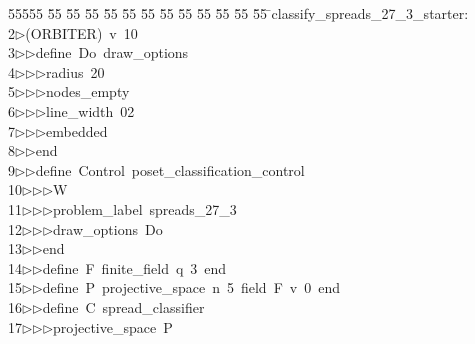 %
%
\begin{tabbing}
55555 \= 55 \= 55 \= 55 \= 55 \= 55 \= 55 \= 55 \= 55 \= 55 \= 55 \= 55 \= 55 \= \>classify\_spreads\_27\_3\_starter:\\[0pt]
2\>$\triangleright$\>(ORBITER)\ v\ 10\ \\[0pt]
3\>$\triangleright$\>$\triangleright$\>define\ Do\ draw\_options\ \\[0pt]
4\>$\triangleright$\>$\triangleright$\>$\triangleright$\>radius\ 20\ \\[0pt]
5\>$\triangleright$\>$\triangleright$\>$\triangleright$\>nodes\_empty\ \\[0pt]
6\>$\triangleright$\>$\triangleright$\>$\triangleright$\>line\_width\ 02\ \\[0pt]
7\>$\triangleright$\>$\triangleright$\>$\triangleright$\>embedded\ \\[0pt]
8\>$\triangleright$\>$\triangleright$\>end\ \\[0pt]
9\>$\triangleright$\>$\triangleright$\>define\ Control\ poset\_classification\_control\ \\[0pt]
10\>$\triangleright$\>$\triangleright$\>$\triangleright$\>W\ \\[0pt]
11\>$\triangleright$\>$\triangleright$\>$\triangleright$\>problem\_label\ spreads\_27\_3\ \\[0pt]
12\>$\triangleright$\>$\triangleright$\>$\triangleright$\>draw\_options\ Do\ \\[0pt]
13\>$\triangleright$\>$\triangleright$\>end\ \\[0pt]
14\>$\triangleright$\>$\triangleright$\>define\ F\ finite\_field\ q\ 3\ end\ \\[0pt]
15\>$\triangleright$\>$\triangleright$\>define\ P\ projective\_space\ n\ 5\ field\ F\ v\ 0\ end\ \\[0pt]
16\>$\triangleright$\>$\triangleright$\>define\ C\ spread\_classifier\ \\[0pt]
17\>$\triangleright$\>$\triangleright$\>$\triangleright$\>projective\_space\ P\ \\[0pt]

\end{tabbing}
